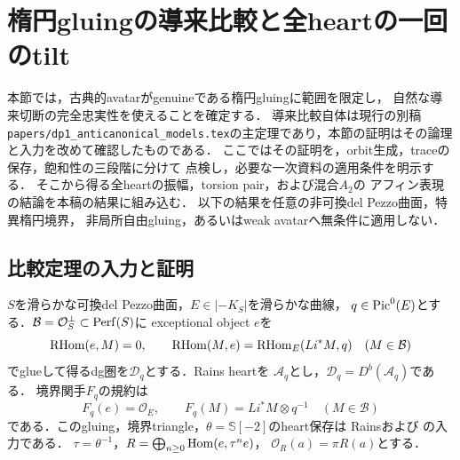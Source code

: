 \section{楕円gluingの導来比較と全heartの一回のtilt}
\label{sec:resonance-global-heart}
本節では，古典的avatarがgenuineである楕円gluingに範囲を限定し，
自然な導来切断の完全忠実性を使えることを確定する．
導来比較自体は現行の別稿
\texttt{papers/dp1\_anticanonical\_models.tex}の主定理であり，本節の証明はその論理と入力を改めて確認したものである．
ここではその証明を，orbit生成，traceの保存，飽和性の三段階に分けて
点検し，必要な一次資料の適用条件を明示する．
そこから得る全heartの振幅，torsion pair，および混合$A_2$の
アフィン表現の結論を本稿の結果に組み込む．
以下の結果を任意の非可換del Pezzo曲面，特異楕円境界，
非局所自由gluing，あるいはweak avatarへ無条件に適用しない．

\subsection{比較定理の入力と証明}
$S$を滑らかな可換del Pezzo曲面，$E\in|-K_S|$を滑らかな曲線，
$q\in\operatorname{Pic}^0(E)$とする．$\mathcal B=\mathcal O_S^\perp\subset\operatorname{Perf}(S)$に
exceptional object $e$を
\[
\operatorname{RHom}(e,M)=0,\qquad
\operatorname{RHom}(M,e)=\operatorname{RHom}_E(Li^*M,q)\quad(M\in\mathcal B)
\]
でglueして得るdg圏を$\mathcal D_q$とする．Rains heartを
$\mathcal A_q$とし，$\mathcal D_q=D^b(\mathcal A_q)$である．
境界関手$F_q$の規約は
\[
F_q(e)=\mathcal O_E,\qquad F_q(M)=Li^*M\otimes q^{-1}
\quad(M\in\mathcal B)
\]
である．このgluing，境界triangle，$\theta=\mathbb S[-2]$のheart保存は
Rains\cite[\S4, (4.4), (4.7)]{RainsFiltered}および
\cite[Theorem 4.30, \S5]{RainsBirational}の入力である．
$\tau=\theta^{-1}$，$R=\bigoplus_{n\ge0}\operatorname{Hom}(e,\tau^ne)$，
$\mathcal O_R(a)=\pi R(a)$とする．

